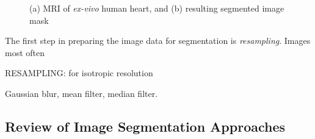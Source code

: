 \begin{figure}[ht]
\centering
{}
%
\caption{(a) MRI of \textit{ex-vivo} human heart, and (b) resulting segmented image mask}
\label{fig:seg}
\end{figure}

The first step in preparing the image data for segmentation is \textit{resampling}. Images most often 

RESAMPLING: for isotropic resolution

Gaussian blur, mean filter, median filter.

\subsection{Review of Image Segmentation Approaches}
\label{Review of Image Segmentation Approaches}


